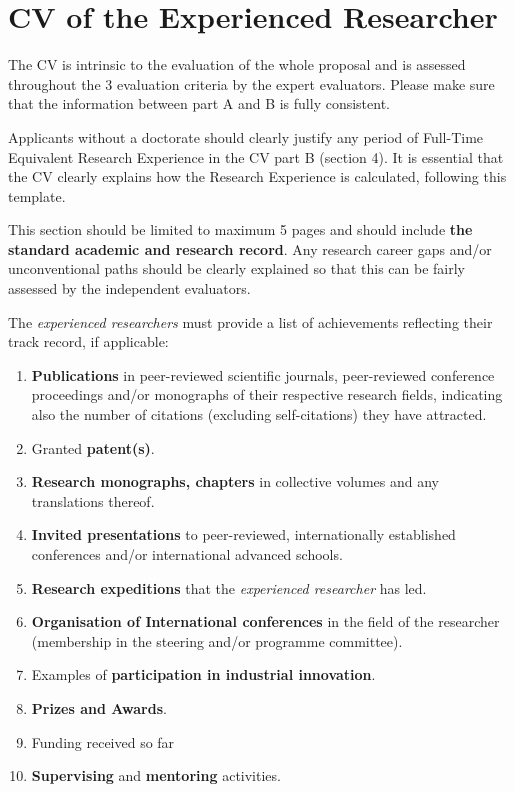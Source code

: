 
\newpage
{}
\section{CV of the Experienced Researcher}
\label{sec:cv}

The CV is intrinsic to the evaluation of the whole proposal and is assessed throughout the 3 evaluation criteria by the expert evaluators. Please make sure that the information between part A and B is fully consistent.

Applicants without a doctorate should clearly justify any period of Full-Time Equivalent Research Experience in the CV part B (section 4). It is essential that the CV clearly explains how the Research Experience is calculated, following this template.

\medskip\noindent
This section should be limited to maximum 5 pages and should include \textbf{the standard academic and research record}. 
Any research career gaps and/or unconventional paths should be clearly explained so that this can be fairly assessed by the independent evaluators.

\medskip\noindent
The {\em experienced researchers} must provide a list of achievements reflecting their track record, if applicable:

\begin{enumerate}
	\item \textbf{Publications} in peer-reviewed scientific journals, peer-reviewed conference proceedings and/or monographs of their respective research fields, indicating also the number of citations (excluding self-citations) they have attracted.
	\item Granted \textbf{patent(s)}.
	\item \textbf{Research monographs, chapters} in collective volumes and any translations thereof.
	\item \textbf{Invited presentations} to peer-reviewed, internationally established conferences and/or international advanced schools.
	\item \textbf{Research expeditions} that the {\em experienced researcher} has led. 
	\item \textbf{Organisation of International conferences} in the field of the researcher (membership in the steering and/or programme committee).
	\item Examples of \textbf{participation in industrial innovation}.
	\item \textbf{Prizes and Awards}.
	\item Funding received so far
	\item \textbf{Supervising} and \textbf{mentoring} activities.
\end{enumerate}





